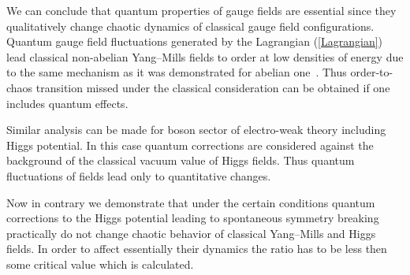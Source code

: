 \documentclass[a4paper,12pt]{article}
\begin{document}
We can conclude that quantum properties of gauge fields are essential since they
quali\-tatively change chaotic dynamics of classical gauge field configurations.
Quantum gauge field fluctuations generated by the Lagrangian (\ref{Lagrangian}) lead
classical non-abelian Yang--Mills fields to order at low densities of energy due to
the same mechanism as it was demonstrated for abelian one~\cite{1997}. Thus
order-to-chaos transition missed under the classical consideration can be obtained if
one includes quantum effects.

Similar analysis can be made for boson sector of electro-weak theory including Higgs
potential. In this case quantum corrections are considered against the background of
the classical vacuum value of Higgs fields. Thus quantum fluctuations of fields lead
only to quantitative changes.

Now in contrary we demonstrate that under the certain conditions quantum corrections
to the Higgs potential leading to spontaneous symmetry breaking practically do not
change chaotic behavior of classical Yang--Mills and Higgs fields. In order to affect
essentially their dynamics the ratio \coordHE{} has to be less then some
critical value which is calculated.
\end{document}
